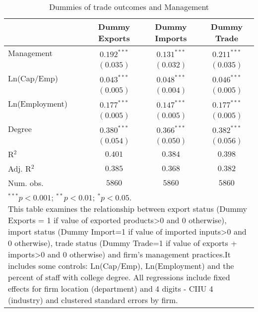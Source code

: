 \documentclass{article}
\begin{document}
\begin{table}
\caption{Dummies of trade outcomes and Management}
\begin{center}
\begin{normalsize}
\begin{tabular}{l c c c}
\hline
 & Dummy Exports & Dummy Imports & Dummy Trade \\
\hline
Management     & $0.192^{***}$ & $0.131^{***}$ & $0.211^{***}$ \\
               & $(0.035)$     & $(0.032)$     & $(0.035)$     \\
Ln(Cap/Emp)    & $0.043^{***}$ & $0.048^{***}$ & $0.046^{***}$ \\
               & $(0.005)$     & $(0.004)$     & $(0.005)$     \\
Ln(Employment) & $0.177^{***}$ & $0.147^{***}$ & $0.177^{***}$ \\
               & $(0.005)$     & $(0.005)$     & $(0.005)$     \\
Degree         & $0.380^{***}$ & $0.366^{***}$ & $0.382^{***}$ \\
               & $(0.054)$     & $(0.050)$     & $(0.056)$     \\
\hline
R$^2$          & $0.401$       & $0.384$       & $0.398$       \\
Adj. R$^2$     & $0.385$       & $0.368$       & $0.382$       \\
Num. obs.      & $5860$        & $5860$        & $5860$        \\
\hline
\multicolumn{4}{l}{\scriptsize{\parbox{1\linewidth}{\vspace{3pt}$^{***}p<0.001$; $^{**}p<0.01$; $^{*}p<0.05$. \\This table examines the relationship between export status (Dummy Exports = 1 if value of exported products>0 and 0 otherwise), import status (Dummy Import=1 if value of imported inputs>0 and 0 otherwise), trade status (Dummy Trade=1 if value of exports + imports>0 and 0 otherwise) and firm's management practices.It includes some controls: Ln(Cap/Emp), Ln(Employment) and the percent of staff with college degree. All regressions include fixed effects for firm location (department) and 4 digits - CIIU 4 (industry) and clustered standard errors by firm.}}}
\end{tabular}
\end{normalsize}
\label{table:coefficients}
\end{center}
\end{table}
\end{document}
